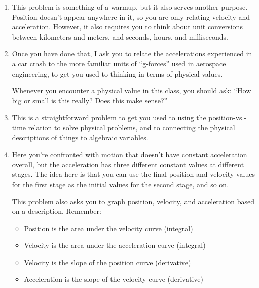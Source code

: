 \documentclass[12pt]{article}
\begin{document}
\Large
\centerline{}
\normalsize

\begin{enumerate}

\item{This problem is something of a warmup, but it also serves another purpose. Position doesn't appear anywhere in it, so you are only
relating velocity and acceleration. However, it also requires you to think about unit conversions between kilometers and meters, and 
seconds, hours, and milliseconds. }

\item Once you have done that, I ask you to relate the accelerations experienced in a car crash to the 
more familiar units of ``g-forces'' used in aerospace engineering, to get you used to thinking in terms of physical values. 

Whenever you encounter a physical value in this class, you should ask: ``How big or small is this really? Does this make sense?''


\item{This is a straightforward problem to get you used to using the position-vs.-time relation to solve physical problems, and to 
connecting the physical descriptions of things to algebraic variables.}


\item{Here you're confronted with motion that doesn't have constant acceleration overall, but the acceleration has three different
constant values at different stages. The idea here is that you can use the final position and velocity values for the first stage as the
initial values for the second stage, and so on.

This problem also asks you to graph position, velocity, and acceleration based on a description. Remember:

\begin{itemize}

\item{Position is the area under the velocity curve (integral)}
\item{Velocity is the area under the acceleration curve (integral)}

\medskip

\item{Velocity is the slope of the position curve (derivative)}
\item{Acceleration is the slope of the velocity curve (derivative)}

\end{itemize}
}


\end{enumerate}
\end{document}
